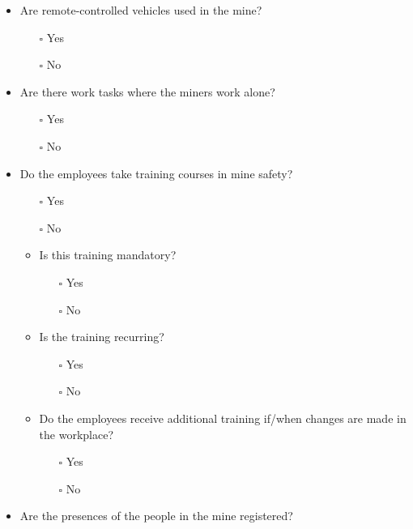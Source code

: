 \documentclass[
  12pt,
]{scrbook}
\providecommand{\tightlist}{%
  \setlength{\itemsep}{0pt}\setlength{\parskip}{0pt}}
\begin{document}
\begin{itemize}
\item
  Are remote-controlled vehicles used in the mine?

  \begin{itemize}
  \tightlist
  \item[$\square$]
    Yes
  \item[$\square$]
    No
  \end{itemize}
\item
  Are there work tasks where the miners work alone?

  \begin{itemize}
  \tightlist
  \item[$\square$]
    Yes
  \item[$\square$]
    No
  \end{itemize}
\item
  Do the employees take training courses in mine safety?

  \begin{itemize}
  \item[$\square$]
    Yes
  \item[$\square$]
    No
  \item
    Is this training mandatory?

    \begin{itemize}
    \tightlist
    \item[$\square$]
      Yes
    \item[$\square$]
      No
    \end{itemize}
  \item
    Is the training recurring?

    \begin{itemize}
    \tightlist
    \item[$\square$]
      Yes
    \item[$\square$]
      No
    \end{itemize}
  \item
    Do the employees receive additional training if/when changes are made in the workplace?

    \begin{itemize}
    \tightlist
    \item[$\square$]
      Yes
    \item[$\square$]
      No
    \end{itemize}
  \end{itemize}
\item
  Are the presences of the people in the mine registered?


\end{itemize}
\end{document}
